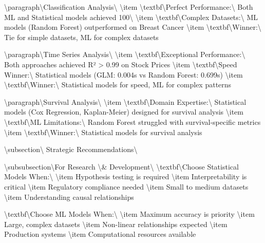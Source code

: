 \documentclass[11pt,a4paper]{article}
\begin{document}
\textbackslash{}paragraph\textbackslash{}{Classification Analysis\textbackslash{}}
\textbackslash{}item \textbackslash{}textbf\textbackslash{}{Perfect Performance:\textbackslash{}} Both ML and Statistical models achieved 100\textbackslash{}%
\textbackslash{}item \textbackslash{}textbf\textbackslash{}{Complex Datasets:\textbackslash{}} ML models (Random Forest) outperformed on Breast Cancer
\textbackslash{}item \textbackslash{}textbf\textbackslash{}{Winner:\textbackslash{}} Tie for simple datasets, ML for complex datasets

\textbackslash{}paragraph\textbackslash{}{Time Series Analysis\textbackslash{}}
\textbackslash{}item \textbackslash{}textbf\textbackslash{}{Exceptional Performance:\textbackslash{}} Both approaches achieved R² > 0.99 on Stock Prices
\textbackslash{}item \textbackslash{}textbf\textbackslash{}{Speed Winner:\textbackslash{}} Statistical models (GLM: 0.004s vs Random Forest: 0.699s)
\textbackslash{}item \textbackslash{}textbf\textbackslash{}{Winner:\textbackslash{}} Statistical models for speed, ML for complex patterns

\textbackslash{}paragraph\textbackslash{}{Survival Analysis\textbackslash{}}
\textbackslash{}item \textbackslash{}textbf\textbackslash{}{Domain Expertise:\textbackslash{}} Statistical models (Cox Regression, Kaplan-Meier) designed for survival analysis
\textbackslash{}item \textbackslash{}textbf\textbackslash{}{ML Limitations:\textbackslash{}} Random Forest struggled with survival-specific metrics
\textbackslash{}item \textbackslash{}textbf\textbackslash{}{Winner:\textbackslash{}} Statistical models for survival analysis

\textbackslash{}subsection\textbackslash{}{ Strategic Recommendations\textbackslash{}}

\textbackslash{}subsubsection\textbackslash{}{For Research \textbackslash{}& Development\textbackslash{}}
\textbackslash{}textbf\textbackslash{}{Choose Statistical Models When:\textbackslash{}}
\textbackslash{}item Hypothesis testing is required
\textbackslash{}item Interpretability is critical
\textbackslash{}item Regulatory compliance needed
\textbackslash{}item Small to medium datasets
\textbackslash{}item Understanding causal relationships

\textbackslash{}textbf\textbackslash{}{Choose ML Models When:\textbackslash{}}
\textbackslash{}item Maximum accuracy is priority
\textbackslash{}item Large, complex datasets
\textbackslash{}item Non-linear relationships expected
\textbackslash{}item Production systems
\textbackslash{}item Computational resources available
\end{document}
